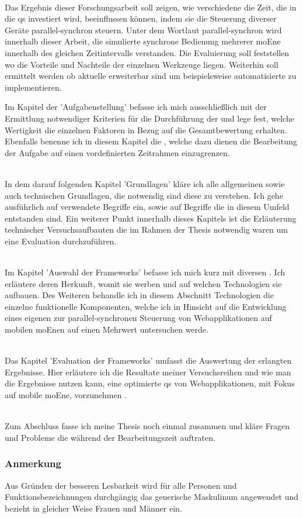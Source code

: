 \\Das Ergebnis dieser Forschungsarbeit soll zeigen, wie verschiedene  die Zeit, die in die \Gls{qs} investiert wird, beeinflussen können, indem sie die Steuerung diverser Geräte \gls{parallel-synchron} steuern. Unter dem Wortlaut \gls{parallel-synchron} wird innerhalb dieser Arbeit, die simulierte synchrone Bedienung mehrerer \Gls{moEn}e innerhalb des gleichen Zeitintervalls verstanden. Die Evaluierung soll feststellen wo die Vorteile und Nachteile der einzelnen Werkzeuge liegen. Weiterhin soll ermittelt werden ob aktuelle  erweiterbar sind um beispielsweise automatisierte  zu implementieren. 




\pagebreak
Im Kapitel der 'Aufgabenstellung' befasse ich mich ausschließlich mit der Ermittlung notwendiger Kriterien für die Durchführung der  und lege fest, welche Wertigkeit die einzelnen Faktoren in Bezug auf die Gesamtbewertung erhalten. Ebenfalls benenne ich in diesem Kapitel die , welche dazu dienen die Bearbeitung der Aufgabe auf einen vordefinierten Zeitrahmen einzugrenzen.

\\In dem darauf folgenden Kapitel 'Grundlagen' kläre ich alle allgemeinen sowie auch technischen Grundlagen, die notwendig sind diese  zu verstehen. Ich gehe ausführlich auf verwendete Begriffe ein, sowie auf Begriffe die in diesem Umfeld entstanden sind. Ein weiterer Punkt innerhalb dieses Kapitels ist die Erläuterung technischer Versuchsaufbauten die im Rahmen der Thesis notwendig waren um eine Evaluation durchzuführen.

\\Im Kapitel 'Auswahl der \Gls{Framework}s' befasse ich mich kurz mit diversen . Ich erläutere deren Herkunft, womit sie werben und auf welchen Technologien sie aufbauen. Des Weiteren behandle ich in diesem Abschnitt Technologien die einzelne funktionelle Komponenten, welche ich in Hinsicht auf die Entwicklung eines eigenen  zur \gls{parallel-synchron}en Steuerung von Webapplikationen auf mobilen \Gls{moEn}en auf einen Mehrwert untersuchen werde.

\\Das Kapitel 'Evaluation der \Gls{Framework}s' umfasst die Auswertung der erlangten Ergebnisse. Hier erläutere ich die Resultate meiner Versuchsreihen und wie man die Ergebnisse nutzen kann, eine optimierte \Gls{qs} von Webapplikationen, mit Fokus auf mobile \Gls{moEn}e, vorzunehmen .

\\Zum Abschluss fasse ich meine Thesis noch einmal zusammen und kläre Fragen und Probleme die während der Bearbeitungszeit auftraten.

\vfill
\subsubsection{Anmerkung}
Aus Gründen der besseren Lesbarkeit wird für alle Personen und Funktionsbezeichnungen durchgängig das generische Maskulinum angewendet und bezieht in gleicher Weise Frauen und Männer ein.